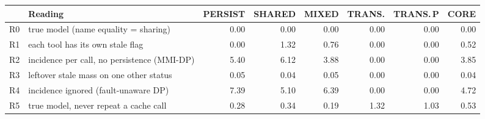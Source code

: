 \begin{tabular}{@{}llrrrrrr@{}}
\toprule
 & Reading & PERSIST & SHARED & MIXED & TRANS. & TRANS.\,P & CORE \\
\midrule
R0 & true model (name equality = sharing) & 0.00 & 0.00 & 0.00 & 0.00 & 0.00 & 0.00 \\
R1 & each tool has its own stale flag & 0.00 & 1.32 & 0.76 & 0.00 & 0.00 & 0.52 \\
R2 & incidence per call, no persistence (MMI-DP) & 5.40 & 6.12 & 3.88 & 0.00 & 0.00 & 3.85 \\
R3 & leftover stale mass on one other status & 0.05 & 0.04 & 0.05 & 0.00 & 0.00 & 0.04 \\
R4 & incidence ignored (fault-unaware DP) & 7.39 & 5.10 & 6.39 & 0.00 & 0.00 & 4.72 \\
R5 & true model, never repeat a cache call & 0.28 & 0.34 & 0.19 & 1.32 & 1.03 & 0.53 \\
\bottomrule
\end{tabular}
